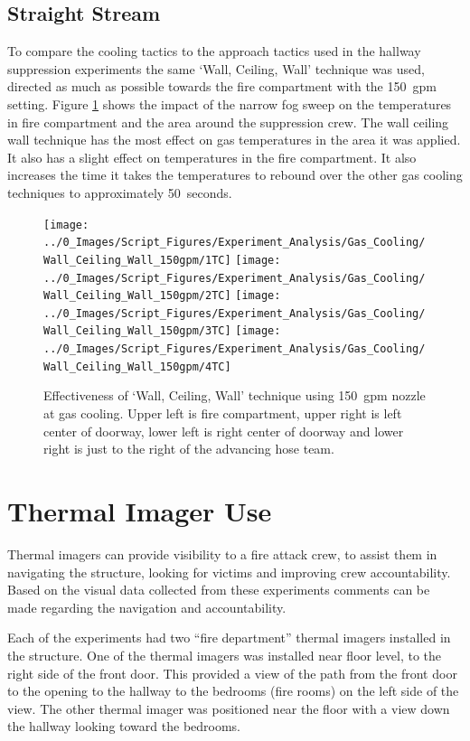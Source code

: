 \documentclass[12pt,oneside]{book}
\begin{document}
\subsection{Straight Stream}
To compare the cooling tactics to the approach tactics used in the hallway suppression experiments the same `Wall, Ceiling, Wall' technique was used, directed as much as possible towards the fire compartment with the 150~gpm setting. Figure \ref{fig:gas_wall_ceiling_wall_150} shows the impact of the narrow fog sweep on the temperatures in fire compartment and the area around the suppression crew. The wall ceiling wall technique has the most effect on gas temperatures in the area it was applied. It also has a slight effect on temperatures in the fire compartment. It also increases the time it takes the temperatures to rebound over the other gas cooling techniques to approximately 50~seconds.

\begin{figure}[H]
\centering
\texttt{[image: ../0\_Images/Script\_Figures/Experiment\_Analysis/Gas\_Cooling/Wall\_Ceiling\_Wall\_150gpm/1TC]}
\texttt{[image: ../0\_Images/Script\_Figures/Experiment\_Analysis/Gas\_Cooling/Wall\_Ceiling\_Wall\_150gpm/2TC]}
\texttt{[image: ../0\_Images/Script\_Figures/Experiment\_Analysis/Gas\_Cooling/Wall\_Ceiling\_Wall\_150gpm/3TC]}
\texttt{[image: ../0\_Images/Script\_Figures/Experiment\_Analysis/Gas\_Cooling/Wall\_Ceiling\_Wall\_150gpm/4TC]}
\caption[Gas Cooling - Straight Stream 150~gpm]{Effectiveness of `Wall, Ceiling, Wall' technique using 150~gpm nozzle at gas cooling. Upper left is fire compartment, upper right is left center of doorway, lower left is right center of doorway and lower right is just to the right of the advancing hose team.}
\label{fig:gas_wall_ceiling_wall_150}
\end{figure}

\section{Thermal Imager Use} \label{tc:thermal_imagers}
Thermal imagers can provide visibility to a fire attack crew, to assist them in navigating the structure, looking for victims and improving crew accountability.  Based on the visual data collected from these experiments comments can be made regarding the navigation and accountability.   

Each of the experiments had two ``fire department'' thermal imagers installed in the structure.  One of the thermal imagers was installed near floor level, to the right side of the front door.  This provided a view of the path from the front door to the opening to the hallway to the bedrooms (fire rooms) on the left side of the view.  The other thermal imager was positioned near the floor with a view down the hallway looking toward the bedrooms.  
\end{document}

